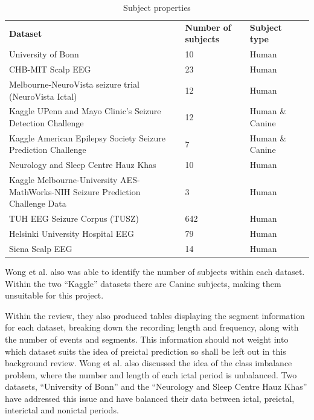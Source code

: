 \documentclass[12pt]{article}
\begin{document}
\begin{table}[H]
\centering
\begin{tabular}{p{}p{}p{}p{}}
\textbf{Dataset}                                                                & \textbf{Number of subjects} & \textbf{Subject type} & \textbf{} \\
University of Bonn                   & 10  & Human &  \\
CHB-MIT Scalp EEG                    & 23  & Human &  \\
Melbourne-NeuroVista seizure trial (NeuroVista Ictal)                           & 12                          & Human                 &           \\
Kaggle UPenn and Mayo Clinic's Seizure Detection Challenge                      & 12                          & Human \& Canine       &           \\
Kaggle American Epilepsy Society Seizure Prediction Challenge                   & 7                           & Human \& Canine       &           \\
Neurology and Sleep Centre Hauz Khas & 10  & Human &  \\
Kaggle Melbourne-University AES-MathWorks-NIH Seizure Prediction Challenge Data & 3                           & Human                 &           \\
TUH EEG Seizure Corpus (TUSZ)        & 642 & Human &  \\
Helsinki University Hospital EEG     & 79  & Human &  \\
Siena Scalp EEG                      & 14  & Human & 
\end{tabular}
\caption{Subject properties \protect\cite{wong2023eeg}}
\end{table}

Wong et al. also was able to identify the number of subjects within each dataset. Within the two ``Kaggle'' datasets there are Canine subjects, making them unsuitable for this project. 

Within the review, they also produced tables displaying the segment information for each dataset, breaking down the recording length and frequency, along with the number of events and segments. This information should not weight into which dataset suits the idea of preictal prediction so shall be left out in this background review. Wong et al. also discussed the idea of the class imbalance problem, where the number and length of each ictal period is unbalanced. Two datasets, ``University of Bonn'' and the ``Neurology and Sleep Centre Hauz Khas'' have addressed this issue and have balanced their data between ictal, preictal, interictal and nonictal periods.
\end{document}
